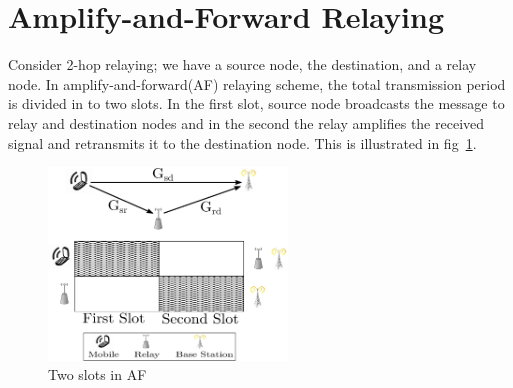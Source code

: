 \documentclass[conference]{IEEEtran}
\begin{document}
%





\section{Amplify-and-Forward Relaying}
Consider 2-hop relaying; we have a source node, the destination, and a relay
node. In amplify-and-forward(AF) relaying scheme, the total transmission period is
divided in to two slots.
In the first slot, source node broadcasts the message to relay and destination nodes
and in the second the relay amplifies the received signal and retransmits it to 
the destination node. This is illustrated in fig~\ref{twoSlots}.
\begin{figure}[!t] 
	\centering 
	\includegraphics[width=2.5in]{img/sysmodel.eps} 
	\caption{Two slots in AF}
	\label{twoSlots} 
\end{figure}
\end{document}
